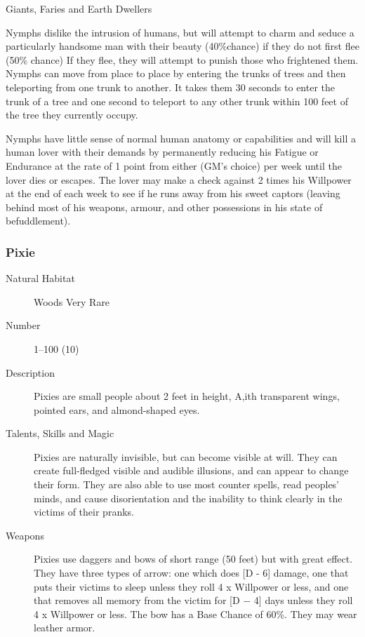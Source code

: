 \begin{mmgroup}{Giants, Faries and Earth Dwellers}
\begin{mmcomment}
 Nymphs dislike the intrusion of humans, but will attempt to
charm and seduce a particularly handsome man with their beauty (40\%chance) if they do not first flee (50\% chance) If they flee, they will
attempt to punish those who frightened them. Nymphs can move from
place to place by entering the trunks of trees and then teleporting
from one trunk to another.  It takes them 30 seconds to enter the
trunk of a tree and one second to teleport to any other trunk within
100 feet of the tree they currently occupy.

Nymphs have little sense of normal human anatomy or capabilities and
will kill a human lover with their demands by permanently reducing his
Fatigue or Endurance at the rate of 1 point from either (GM's choice)
per week until the lover dies or escapes. The lover may make a check
against 2 times his Willpower at the end of each week to see if he
runs away from his sweet captors (leaving behind most of his weapons,
armour, and other possessions in his state of befuddlement).

\end{mmcomment}

\subsubsection{Pixie}

\begin{description}
\item[Natural Habitat] Woods Very Rare

\item[Number] 1–100 (10)

\item[Description] Pixies are small people about 2 feet in height, A,ith
transparent wings, pointed ears, and almond-shaped eyes.

\item[Talents, Skills and Magic] Pixies are naturally invisible, but can become visible at
will. They can create full-fledged visible and audible illusions, and
can appear to change their form.  They are also able to use most
counter spells, read peoples' minds, and cause disorientation and the
inability to think clearly in the victims of their pranks.

\item[Weapons] Pixies use daggers and bows of short range (50 feet) but
with great effect. They have three types of arrow: one which does [D -
6] damage, one that puts their victims to sleep unless they roll 4 x
Willpower or less, and one that removes all memory from the victim for
[D − 4] days unless they roll 4 x Willpower or less. The bow has a
Base Chance of 60\%. They may wear leather armor.


\end{description}
\end{mmgroup}
